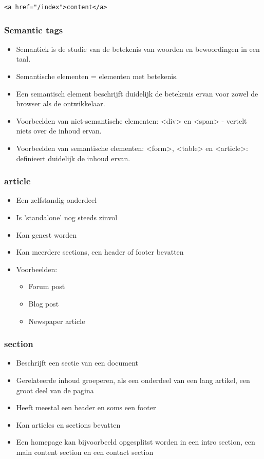 \documentclass{article}
\begin{document}
\begin{lstlisting}
<a href="/index">content</a>
\end{lstlisting}

\subsubsection {Semantic tags}
\begin{itemize}
    \item Semantiek is de studie van de betekenis van woorden en bewoordingen in een taal. 
    \item Semantische elementen = elementen met betekenis.
    \item Een semantisch element beschrijft duidelijk de betekenis ervan voor zowel de browser als de ontwikkelaar.
    \item Voorbeelden van niet-semantische elementen: <div> en <span> - vertelt niets over de inhoud ervan.
    \item Voorbeelden van semantische elementen: <form>, <table> en <article>: definieert duidelijk de inhoud ervan.
\end{itemize}

\subsubsection {article}
\begin{itemize}
    \item Een zelfstandig onderdeel
    \item Is 'standalone' nog steeds zinvol
    \item Kan genest worden
    \item Kan meerdere sections, een header of footer bevatten
    \item Voorbeelden: 
    \begin{itemize}
        \item Forum post
        \item Blog post
        \item Newspaper article
    \end{itemize}
\end{itemize}

\subsubsection {section}
\begin{itemize}
    \item Beschrijft een sectie van een document
    \item Gerelateerde inhoud groeperen, als een onderdeel van een lang artikel, een groot deel van de pagina
    \item Heeft meestal een header en soms een footer
    \item Kan articles en sections bevatten
    \item Een homepage kan bijvoorbeeld opgesplitst worden in een intro section, een main content section en een contact section
\end{itemize}
\end{document}
